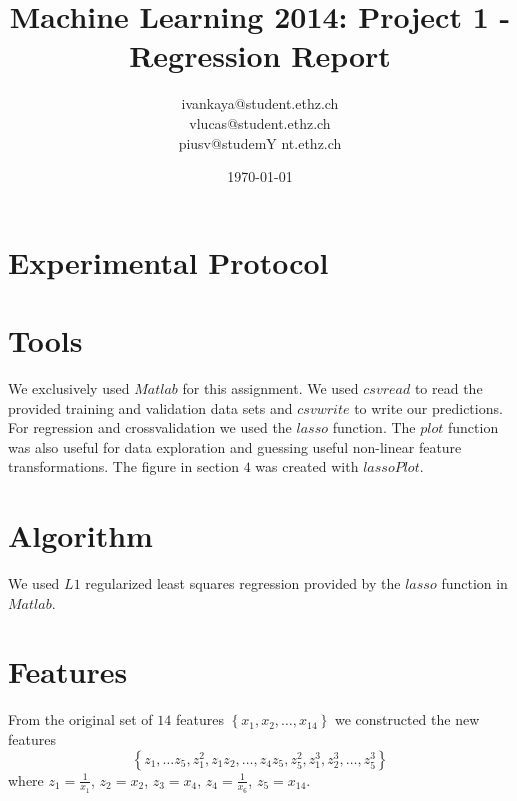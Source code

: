 \documentclass[a4paper, 11pt]{article}
\title{Machine Learning 2014: Project 1 - Regression Report}
\author{ivankaya@student.ethz.ch\\vlucas@student.ethz.ch\\ piusv@studemY nt.ethz.ch\\}
\date{\today}
\begin{document}
\maketitle

\section*{Experimental Protocol}

\section{Tools}

We exclusively used $Matlab$ for this assignment.
We used $csvread$ to read the provided training and validation data sets and
$csvwrite$ to write our predictions. For regression and crossvalidation we used
the $lasso$ function. The $plot$ function was also useful for data exploration
and guessing useful non-linear feature transformations. The figure in section $4$
was created with $lassoPlot$.


\section{Algorithm}
We used $L1$ regularized least squares regression provided by the $lasso$ function in $Matlab$.

\section{Features}

From the original set of $14$ features $\left\{x_1, x_2, \ldots, x_{14} \right\}$
we constructed the new features
\[
\left\{z_1, \ldots z_5, z_{1}^{2}, z_1z_2, \ldots, z_4z_5, z_{5}^{2}, z_{1}^{3}, z_{2}^{3}, \ldots, z_{5}^{3} \right\}
\]
where $z_1 = \frac{1}{x_1}$, $z_2 = x_2$, $z_3 = x_4$, $z_4 = \frac{1}{x_6}$, $z_5 = x_{14}$.
\end{document}
